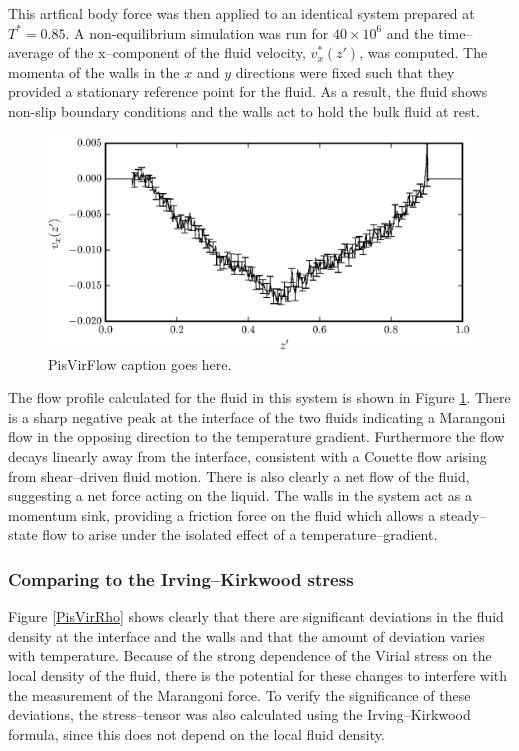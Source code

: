 This artfical body force was then applied to an identical system prepared at $T^{*} = 0.85$.
A non-equilibrium simulation was run for $40 \times 10^{6}$ and the time--average of the x--component of the fluid velocity, $v^{*}_{x}(z')$, was computed.
The momenta of the walls in the $x$ and $y$ directions were fixed such that they provided a stationary reference point for the fluid.
As a result, the fluid shows non-slip boundary conditions and the walls act to hold the bulk fluid at rest.

\begin{figure}[h]
\centering
\includegraphics[scale=0.8]{PisVirFlow}
\caption{PisVirFlow caption goes here.}
\label{PisVirFlow}
\end{figure}
\FloatBarrier
The flow profile calculated for the fluid in this system is shown in Figure \ref{PisVirFlow}. 
There is a sharp negative peak at the interface of the two fluids indicating a Marangoni flow in the opposing direction to the temperature gradient.
Furthermore the flow decays linearly away from the interface, consistent with a Couette flow arising from shear--driven fluid motion.\cite{FluidMech}
There is also clearly a net flow of the fluid, suggesting a net force acting on the liquid.
The walls in the system act as a momentum sink, providing a friction force on the fluid which allows a steady--state flow to arise under the isolated effect of a temperature--gradient.
\FloatBarrier

\subsubsection{Comparing to the Irving--Kirkwood stress}
Figure \ref{PisVirRho} shows clearly that there are significant deviations in the fluid density at the interface and the walls and that the amount of deviation varies with temperature.
Because of the strong dependence of the Virial stress on the local density of the fluid, there is the potential for these changes to interfere with the measurement of the Marangoni force.
To verify the significance of these deviations, the stress--tensor was also calculated using the Irving--Kirkwood formula, since this does not depend on the local fluid density.

